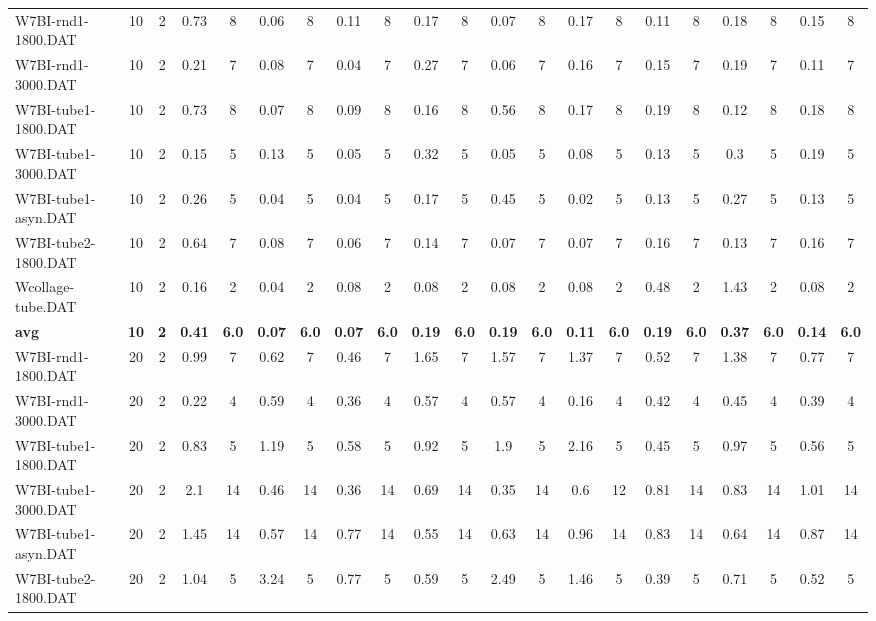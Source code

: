 \begin{sidewaystable}[!ht]
{\begin{tabular}{lcccccccccccccccccccc}
W7BI-rnd1-1800.DAT & 10 & 2 & 0.73 & 8 & 0.06 & 8 & 0.11 & 8 & 0.17 & 8 & 0.07 & 8 & 0.17 & 8 & 0.11 & 8 & 0.18 & 8 & 0.15 & 8 \\
W7BI-rnd1-3000.DAT & 10 & 2 & 0.21 & 7 & 0.08 & 7 & 0.04 & 7 & 0.27 & 7 & 0.06 & 7 & 0.16 & 7 & 0.15 & 7 & 0.19 & 7 & 0.11 & 7 \\
W7BI-tube1-1800.DAT & 10 & 2 & 0.73 & 8 & 0.07 & 8 & 0.09 & 8 & 0.16 & 8 & 0.56 & 8 & 0.17 & 8 & 0.19 & 8 & 0.12 & 8 & 0.18 & 8 \\
W7BI-tube1-3000.DAT & 10 & 2 & 0.15 & 5 & 0.13 & 5 & 0.05 & 5 & 0.32 & 5 & 0.05 & 5 & 0.08 & 5 & 0.13 & 5 & 0.3 & 5 & 0.19 & 5 \\
W7BI-tube1-asyn.DAT & 10 & 2 & 0.26 & 5 & 0.04 & 5 & 0.04 & 5 & 0.17 & 5 & 0.45 & 5 & 0.02 & 5 & 0.13 & 5 & 0.27 & 5 & 0.13 & 5 \\
W7BI-tube2-1800.DAT & 10 & 2 & 0.64 & 7 & 0.08 & 7 & 0.06 & 7 & 0.14 & 7 & 0.07 & 7 & 0.07 & 7 & 0.16 & 7 & 0.13 & 7 & 0.16 & 7 \\
Wcollage-tube.DAT & 10 & 2 & 0.16 & 2 & 0.04 & 2 & 0.08 & 2 & 0.08 & 2 & 0.08 & 2 & 0.08 & 2 & 0.48 & 2 & 1.43 & 2 & 0.08 & 2 \\
\cline{1-21} \textbf{avg} & \textbf{10} & \textbf{2} & \textbf{0.41} & \textbf{6.0} & \textbf{0.07} & \textbf{6.0} & \textbf{0.07} & \textbf{6.0} & \textbf{0.19} & \textbf{6.0} & \textbf{0.19} & \textbf{6.0} & \textbf{0.11} & \textbf{6.0} & \textbf{0.19} & \textbf{6.0} & \textbf{0.37} & \textbf{6.0} & \textbf{0.14} & \textbf{6.0} \\ \cline{1-21}
W7BI-rnd1-1800.DAT & 20 & 2 & 0.99 & 7 & 0.62 & 7 & 0.46 & 7 & 1.65 & 7 & 1.57 & 7 & 1.37 & 7 & 0.52 & 7 & 1.38 & 7 & 0.77 & 7 \\
W7BI-rnd1-3000.DAT & 20 & 2 & 0.22 & 4 & 0.59 & 4 & 0.36 & 4 & 0.57 & 4 & 0.57 & 4 & 0.16 & 4 & 0.42 & 4 & 0.45 & 4 & 0.39 & 4 \\
W7BI-tube1-1800.DAT & 20 & 2 & 0.83 & 5 & 1.19 & 5 & 0.58 & 5 & 0.92 & 5 & 1.9 & 5 & 2.16 & 5 & 0.45 & 5 & 0.97 & 5 & 0.56 & 5 \\
W7BI-tube1-3000.DAT & 20 & 2 & 2.1 & 14 & 0.46 & 14 & 0.36 & 14 & 0.69 & 14 & 0.35 & 14 & 0.6 & 12 & 0.81 & 14 & 0.83 & 14 & 1.01 & 14 \\
W7BI-tube1-asyn.DAT & 20 & 2 & 1.45 & 14 & 0.57 & 14 & 0.77 & 14 & 0.55 & 14 & 0.63 & 14 & 0.96 & 14 & 0.83 & 14 & 0.64 & 14 & 0.87 & 14 \\
W7BI-tube2-1800.DAT & 20 & 2 & 1.04 & 5 & 3.24 & 5 & 0.77 & 5 & 0.59 & 5 & 2.49 & 5 & 1.46 & 5 & 0.39 & 5 & 0.71 & 5 & 0.52 & 5 \\

\end{tabular}}
\end{sidewaystable}
